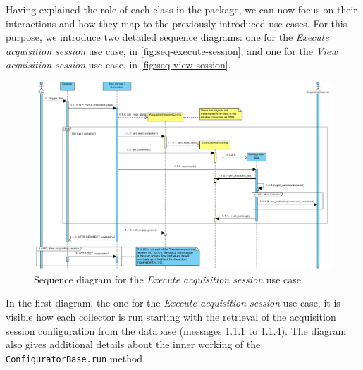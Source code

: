 Having explained the role of each class in the package, we can now focus on their interactions and how they map to the previously introduced use cases. For this purpose, we introduce two detailed sequence diagrams: one for the \emph{Execute acquisition session} use case, in \vref{fig:seq-execute-session}, and one for the \emph{View acquisition session} use case, in \vref{fig:seq-view-session}.

\begin{figure}
  \includegraphics[height=\linewidth,angle=90,origin=c]{images/seq-execute-session}
  \caption{Sequence diagram for the \emph{Execute acquisition session} use case.}
  \label{fig:seq-execute-session}
\end{figure}

In the first diagram, the one for the \emph{Execute acquisition session} use case, it is visible how each collector is run starting with the retrieval of the acquisition session configuration from the database (messages 1.1.1 to 1.1.4). The diagram also gives additional details about the inner working of the \texttt{ConfiguratorBase.run} method.

